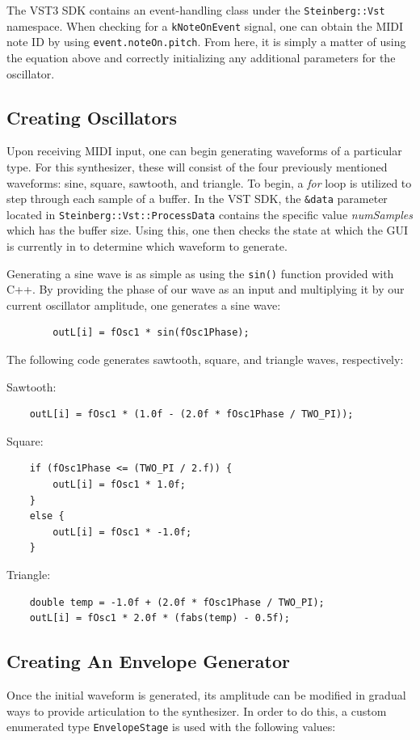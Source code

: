 \documentclass[12pt]{article}
\begin{document}
The VST3 SDK contains an event-handling class under the \verb*|Steinberg::Vst| namespace. When checking for a \verb|kNoteOnEvent| signal, one can obtain the MIDI note ID by using \verb*|event.noteOn.pitch|. From here, it is simply a matter of using the equation above and correctly initializing any additional parameters for the oscillator. 

\subsection{Creating Oscillators}
Upon receiving MIDI input, one can begin generating waveforms of a particular type. For this synthesizer, these will consist of the four previously mentioned waveforms: sine, square, sawtooth, and triangle. To begin, a \textit{for} loop is utilized to step through each sample of a buffer. In the VST SDK, the \verb*|&data| parameter located in \verb*|Steinberg::Vst::ProcessData| contains the specific value \textit{numSamples} which has the buffer size. Using this, one then checks the state at which the GUI is currently in to determine which waveform to generate.

Generating a sine wave is as simple as using the \verb*|sin()| function provided with C++. By providing the phase of our wave as an input and multiplying it by our current oscillator amplitude, one generates a sine wave:

\begin{lstlisting}
		outL[i] = fOsc1 * sin(fOsc1Phase);
\end{lstlisting} 

The following code generates sawtooth, square, and triangle waves, respectively:

Sawtooth:
\begin{lstlisting}
	outL[i] = fOsc1 * (1.0f - (2.0f * fOsc1Phase / TWO_PI));
\end{lstlisting} 

Square:
\begin{lstlisting}
	if (fOsc1Phase <= (TWO_PI / 2.f)) {
		outL[i] = fOsc1 * 1.0f;
	}
	else {
		outL[i] = fOsc1 * -1.0f;
	}
\end{lstlisting} 

Triangle:
\begin{lstlisting}
	double temp = -1.0f + (2.0f * fOsc1Phase / TWO_PI);
	outL[i] = fOsc1 * 2.0f * (fabs(temp) - 0.5f);
\end{lstlisting} 


\subsection{Creating An Envelope Generator}
Once the initial waveform is generated, its amplitude can be modified in gradual ways to provide articulation to the synthesizer. In order to do this, a custom enumerated type \verb*|EnvelopeStage| is used with the following values:
\end{document}
